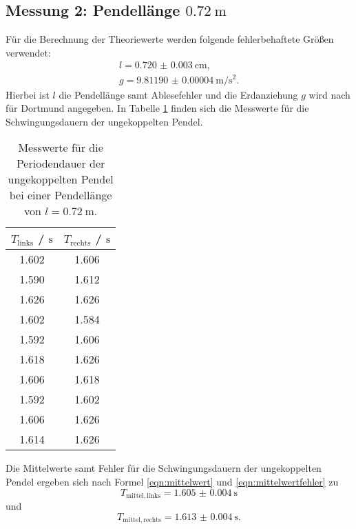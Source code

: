 \subsection{Messung 2: Pendellänge $\SI{0.72}{\meter}$}
Für die Berechnung der Theoriewerte werden folgende fehlerbehaftete Größen verwendet:
\begin{gather*}
	l=\SI{0.720(3)}{\centi\meter} \text{,}\\
	g=\SI{9.81190(4)}{\meter\per\square\second} \text{.}
\end{gather*}
Hierbei ist $l$ die Pendellänge samt Ablesefehler und die Erdanziehung $g$ wird nach \cite{G} für Dortmund angegeben.
In Tabelle \ref{tab:rivaldo} finden sich die Messwerte für die Schwingungsdauern der ungekoppelten Pendel.
\begin{table}
	\centering
	\caption{Messwerte für die Periodendauer der ungekoppelten Pendel bei einer Pendellänge von $l=\SI{0.72}{\meter}$.}
	\label{tab:rivaldo}
	\begin{tabular}{cc}
		\toprule
		$T_{\mathrm{links}}$ / $ \si{\second}$ & $T_{\mathrm{rechts}}$ / $\si{\second}$ \\
		\midrule
		1.602                                  & 1.606                                  \\
		1.590                                  & 1.612                                  \\
		1.626                                  & 1.626                                  \\
		1.602                                  & 1.584                                  \\
		1.592                                  & 1.606                                  \\
		1.618                                  & 1.626                                  \\
		1.606                                  & 1.618                                  \\
		1.592                                  & 1.602                                  \\
		1.606                                  & 1.626                                  \\
		1.614                                  & 1.626                                  \\
		\bottomrule
	\end{tabular}
\end{table}

Die Mittelwerte samt Fehler für die Schwingungsdauern der ungekoppelten Pendel ergeben sich nach Formel \eqref{eqn:mittelwert} und \eqref{eqn:mittelwertfehler} zu
\begin{equation*}
	T_{\mathrm{mittel,links}} = \SI{1.605(4)}{\second}
\end{equation*}
und
\begin{equation*}
	T_{\mathrm{mittel,rechts}} = \SI{1.613(4)}{\second} \mathrm{.}
\end{equation*}

